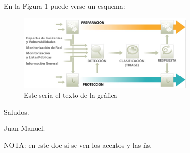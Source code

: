 \documentclass{article}
\begin{document}
En la Figura 1 puede verse un esquema: \newline

\begin{figure}[!htb]\centering
\includegraphics[scale=0.4]{./img/1-gis}
\caption{Este sería el texto de la gráfica}\end{figure}


Saludos.

Juan Manuel.

NOTA: en este doc si se ven los acentos y las ñs.
\end{document}
